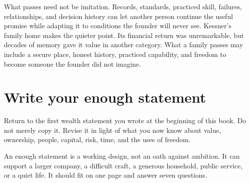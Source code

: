 What passes need not be imitation. Records, standards, practiced skill,
failures, relationships, and decision history can let another person continue
the useful promise while adapting it to conditions the founder will never see.
Kessner's family home makes the quieter point. Its financial return was
unremarkable, but decades of memory gave it value in another category. What a
family passes may include a secure place, honest history, practiced
capability, and freedom to become someone the founder did not imagine.

\section{Write your enough statement}

Return to the first wealth statement you wrote at the beginning of this book.
Do not merely copy it. Revise it in light of what you now know about value,
ownership, people, capital, risk, time, and the uses of freedom.

An enough statement is a working design, not an oath against ambition. It can
support a larger company, a difficult craft, a generous household, public
service, or a quiet life. It should fit on one page and answer seven questions.

